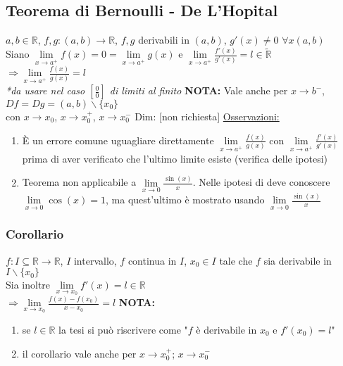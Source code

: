 \documentclass{article}
\begin{document}
\subsection{Teorema di Bernoulli - De L'Hopital}
$a,b \in \mathbb{R}$, $f,g:(a,b) \to \mathbb{R}$, $f,g$ derivabili in $(a,b)$, $g'(x) \neq 0$ $\forall x (a,b)$\\
Siano $\lim\limits_ {x \to a^+ }f(x) = 0 = \lim\limits_ {x \to a^+}g(x)$ e $\lim\limits_ {x \to a^+}\frac{f'(x)}{g'(x)} = l \in \tilde{\mathbb{R}}$\\
$\Rightarrow \lim\limits_{x \to a^+} \frac{f(x)}{g(x)} = l$\\
\textit{*da usare nel caso $[\frac{0}{0}]$ di limiti al finito}
\bigbreak
\noindent \textbf{NOTA:} Vale anche per $x \to b^-$, $Df = Dg = (a, b) \backslash \{x_0\}$\\
\indent con $x \to x_0$, $x \to x_0^+$, $x \to x_0^-$
\bigbreak
\noindent Dim: [non richiesta]
\bigbreak
\noindent \underline{Osservazioni:}
\begin{enumerate}
    \item È un errore comune uguagliare direttamente $\lim\limits_ {x \to a^+} \frac{f(x)}{g(x)}$ con $\lim\limits_ {x \to a^+} \frac{f'(x)}{g'(x)}$ prima di aver verificato che l'ultimo limite esiste (verifica delle ipotesi)

    \item Teorema non applicabile a $\lim\limits_ {x \to 0} \frac{\sin(x)}{x}$. Nelle ipotesi di deve conoscere $\lim\limits_ {x \to 0} \cos(x) = 1$, ma quest'ultimo è mostrato usando $\lim\limits_ {x \to 0} \frac{\sin(x)}{x}$
\end{enumerate}

\subsubsection{Corollario}
$f:I \subseteq \mathbb{R} \to \mathbb{R}$, $I$ intervallo, $f$ continua in $I$, $x_0 \in I$ tale che $f$ sia derivabile in $I \backslash \{x_0\}$\\
Sia inoltre $\lim\limits_ {x \to x_0} f'(x) = l \in \mathbb{R}$\\
$\Rightarrow \lim\limits_ {x \to x_0} \frac{f(x)-f(x_0)}{x-x_0} = l$
\bigbreak
\noindent \textbf{NOTA:} 
\begin{enumerate}
    \item se $l \in \mathbb{R}$ la tesi si può riscrivere come "$f$ è derivabile in $x_0$ e $f'(x_0) = l$"
    \item il corollario vale anche per $x \to x_0^+$; $x \to x_0^-$
\end{enumerate}
\end{document}
